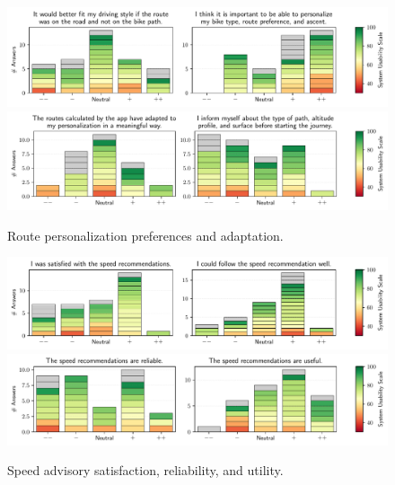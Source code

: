 \begin{figure}[t]
\caption{Route personalization preferences and adaptation.}\label{fig:route-personalization}
\includegraphics[width=\linewidth]{images/app-usability-questions-route-personalization.pdf}
\\
\includegraphics[width=\linewidth]{images/app-usability-questions-route-personalization-adaptation.pdf}
\end{figure}

\begin{figure}[t]
\caption{Speed advisory satisfaction, reliability, and utility.}\label{fig:speed-recommendations-satisfaction}
\includegraphics[width=\linewidth]{images/app-usability-questions-speed-recommendations-satisfaction.pdf}
\\
\includegraphics[width=\linewidth]{images/app-usability-questions-speed-recommendations-reliability.pdf}
\end{figure}
          

